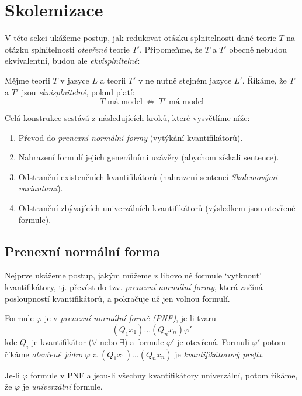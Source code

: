 \section{Skolemizace}\label{section:skolemization}

V této sekci ukážeme postup, jak redukovat otázku splnitelnosti dané teorie $T$ na otázku splnitelnosti \emph{otevřené} teorie $T'$. Připomeňme, že $T$ a $T'$ obecně nebudou ekvivalentní, budou ale \emph{ekvisplnitelné}:

\begin{definition}[Ekvisplnitelnost]
Mějme teorii $T$ v jazyce $L$ a teorii $T'$ v ne nutně stejném jazyce $L'$. Říkáme, že $T$ a $T'$ jsou \emph{ekvisplnitelné},
pokud platí:
$$
\text{$T$ má model}\ \Leftrightarrow\ \text{$T'$ má model}
$$
\end{definition}

Celá konstrukce sestává z následujících kroků, které vysvětlíme níže:
\begin{enumerate}
    \item Převod do \emph{prenexní normální formy} (vytýkání kvantifikátorů).
    \item Nahrazení formulí jejich generálními uzávěry (abychom získali sentence).
    \item Odstranění existenčních kvantifikátorů (nahrazení sentencí \emph{Skolemovými variantami}).
    \item Odstranění zbývajících univerzálních kvantifikátorů (výsledkem jsou otevřené formule).
\end{enumerate}

\subsection{Prenexní normální forma}

Nejprve ukážeme postup, jakým můžeme z libovolné formule `vytknout' kvantifikátory, tj. převést do tzv. \emph{prenexní normální formy}, která začíná posloupností kvantifikátorů, a pokračuje už jen volnou formulí.

\begin{definition}[PNF]
    Formule $\varphi$ je v \emph{prenexní normální formě (PNF)}, je-li tvaru
    $$
    (Q_1x_1)\dots(Q_nx_n)\varphi'
    $$
    kde $Q_i$ je kvantifikátor ($\forall$ nebo $\exists$) a formule $\varphi'$ je otevřená. Formuli $\varphi'$ potom říkáme \emph{otevřené jádro} $\varphi$ a $(Q_1x_1)\dots(Q_nx_n)$ je \emph{kvantifikátorový prefix}.

    Je-li $\varphi$ formule v PNF a jsou-li všechny kvantifikátory univerzální, potom říkáme, že $\varphi$ je \emph{univerzální} formule.
\end{definition}

